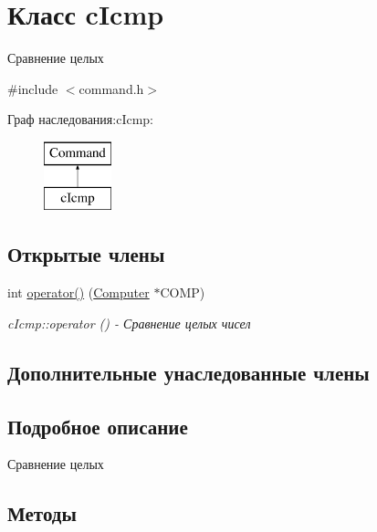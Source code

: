\hypertarget{classc_icmp}{}\section{Класс c\+Icmp}
\label{classc_icmp}


Сравнение целых  




{\ttfamily \#include $<$command.\+h$>$}

Граф наследования\+:c\+Icmp\+:\begin{figure}[H]
\begin{center}
\leavevmode
\includegraphics[height=2.000000cm]{classc_icmp}
\end{center}
\end{figure}
\subsection*{Открытые члены}
\begin{DoxyCompactItemize}
\item 
int \hyperlink{classc_icmp_abde58eb4e568e089f38966a4c6ab6256}{operator()} (\hyperlink{class_computer}{Computer} $\ast$C\+O\+MP)
\begin{DoxyCompactList}\small\item\em c\+Icmp\+::operator () -\/ Сравнение целых чисел \end{DoxyCompactList}\end{DoxyCompactItemize}
\subsection*{Дополнительные унаследованные члены}


\subsection{Подробное описание}
Сравнение целых 

\subsection{Методы}
\hypertarget{classc_icmp_abde58eb4e568e089f38966a4c6ab6256}{}\label{classc_icmp_abde58eb4e568e089f38966a4c6ab6256} 
